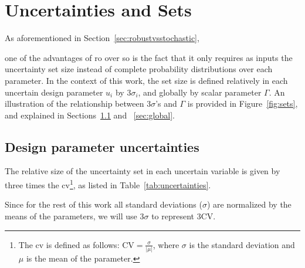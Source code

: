 \section{Uncertainties and Sets}
\label{uncertainties_and_sets}

As aforementioned in Section~\ref{sec:robustvsstochastic}, {\color{blue}one of the advantages
of \gls{ro} over \gls{so} is the fact that it only requires as inputs
the uncertainty set size instead of complete probability distributions
over each parameter.
In the context of this work, the set size is defined relatively in each
uncertain design parameter $u_i$ by $3\sigma_i$, and globally by scalar parameter
$\Gamma$. An illustration of the relationship between $3\sigma$'s and $\Gamma$
is provided in Figure~\ref{fig:sets}, and explained in Sections~\ref{sec:relative} and ~\ref{sec:global}.

\subsection{Design parameter uncertainties}
\label{sec:relative}

The relative size of the uncertainty set in each uncertain variable is
given by three times the \gls{cv}\footnote{The \gls{cv}
is defined as follows: $\text{CV} = \frac{\sigma}{|\mu|}$,
where $\sigma$ is the standard deviation and $\mu$ is the mean of the parameter.},
as listed in Table~\ref{tab:uncertainties}.} Since for the rest of this work
all standard deviations ($\sigma$) are normalized by the means of the parameters, we will use $3\sigma$
to represent $3\text{CV}$.

